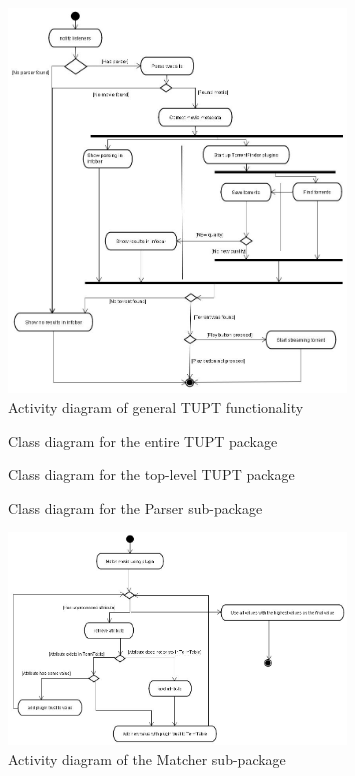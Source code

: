 \begin{figure}[hp]
  \centering
      \includegraphics[width=0.8\textwidth]{TUPT-activitydiagram.jpg}
  \caption{Activity diagram of general TUPT functionality}
  \label{fig:activitytupt}
\end{figure}

\begin{figure}[hp]
  \centering
\resizebox{\linewidth}{!}{%
\tikzimgGeneralTUPT
}
  \caption{Class diagram for the entire TUPT package}
  \label{fig:classdiagramgeneraltupt}
\end{figure}

\begin{figure}[hp]
  \centering
\resizebox{\linewidth}{!}{%
\tikzimgSpecificTUPT
}
  \caption{Class diagram for the top-level TUPT package}
  \label{fig:classdiagramspecifictupt}
\end{figure}

\begin{figure}[hp]
  \centering
\resizebox{\linewidth}{!}{%
\tikzimgParser
}
  \caption{Class diagram for the Parser sub-package}
  \label{fig:classdiagramparser}
\end{figure}

\begin{figure}[hp]
  \centering
      \includegraphics[width=0.8\textwidth]{Matcher-activitydiagram.jpg}
  \caption{Activity diagram of the Matcher sub-package}
  \label{fig:activitymatcher}
\end{figure}

